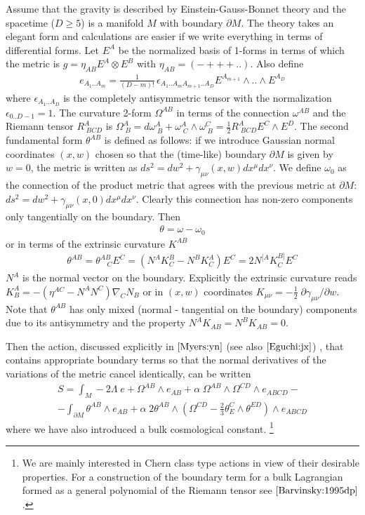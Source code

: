 \documentclass[a4paper,a4paper]{article}
\begin{document}
Assume that the gravity is described by Einstein-Gauss-Bonnet theory and
the spacetime ($D \geq 5$) is a manifold $M$ with boundary $\partial M$. The theory
takes an elegant form and calculations are easier if we write everything in terms
of differential forms. 
Let $E^A$ be the normalized basis of 1-forms in terms of which the metric is  $g= \eta_{AB} E^A \otimes E^B$
with $\eta_{AB}=(-+++..)$. Also define
\begin{eqnarray}
e_{A_1..A_m}=\frac{1}{(D-m)!} \, \epsilon_{A_1..A_m A_{m+1}..A_D} E^{A_{m+1}} \wedge .. \wedge E^{A_D}
\end{eqnarray}
 where
$\epsilon_{A_1..A_D}$ is the completely antisymmetric tensor with the normalization $\epsilon_{0..D-1}=1$.
The curvature 2-form $\Omega^{AB}$ in terms of the connection $\omega^{AB}$ and 
the Riemann tensor $R^A_{\; BCD} $ is
$\Omega^A_{\;B}=d\omega^A_{\;B}+\omega^A_{\;C} \wedge \omega^C_{\;B}=\frac{1}{2} R^A_{\; BCD} E^C \wedge E^D$.
The second fundamental form $\theta^{AB}$ is defined as follows:
if we introduce  Gaussian normal coordinates $(x,w)$ chosen so that the (time-like) boundary 
$\partial M$ is given by $w=0$, the
metric is written as
$ds^2=dw^2+ \gamma_{\mu\nu}(x,w) dx^{\mu} dx^{\nu}$.
We define $\omega_0$ as the connection of the product metric that agrees
 with the previous metric at $\partial M$: $ds^2= dw^2+\gamma_{\mu\nu}(x,0) dx^{\mu} dx^{\nu}$.
Clearly this connection has non-zero components only tangentially on the boundary. Then
\begin{eqnarray}
\theta= \omega- \omega_0
\end{eqnarray}
or in terms of the extrinsic curvature $K^{AB}$ 
\begin{eqnarray}
\theta^{AB}=\theta^{AB}_{\quad C} E^C=(N^A K^B_C- N^B K^A_C) E^C= 2 N^{[A} K^{B]}_C E^C
\end{eqnarray}
$N^A$ is the normal vector on the boundary.
Explicitly the extrinsic curvature reads $K^A_B=-(\eta^{AC}-N^AN^C) \nabla_C N_B$ or in
$(x,w)$ coordinates
$K_{\mu\nu}=-\frac{1}{2} \; \partial \gamma_{\mu\nu}/ \partial w$.
Note that $\theta^{AB}$ has only mixed (normal - tangential on the boundary) components
due to its antisymmetry and the property  $N^A K_{AB}=N^B K_{AB}=0$.

Then the action, discussed explicitly in $\cite{Myers:yn}$
(see also $\cite{Eguchi:jx}$) 
, that contains appropriate
boundary terms so that the normal derivatives of the variations of the metric
cancel identically, can be written
\begin{eqnarray}  \label{action}
S=\int_M -2\Lambda \; e+\Omega^{AB} \wedge e_{AB} + \alpha \; \Omega^{AB} \wedge \Omega^{CD} \wedge e_{ABCD}- \\ \nonumber
- \int_{\partial M} \theta^{AB} \wedge e_{AB}+ \alpha \; 2 \theta^{AB} \wedge 
( \Omega^{CD} - \frac{2}{3} \theta^C_E \wedge \theta^{ED}) \wedge e_{ABCD}
\end{eqnarray}
where we have also introduced a bulk cosmological constant.
\footnote{We are mainly interested in Chern class type actions in view of their desirable
properties. For a construction of the boundary term for a bulk Lagrangian formed as
a general polynomial of the Riemann tensor
see $\cite{Barvinsky:1995dp}$. }
\end{document}
